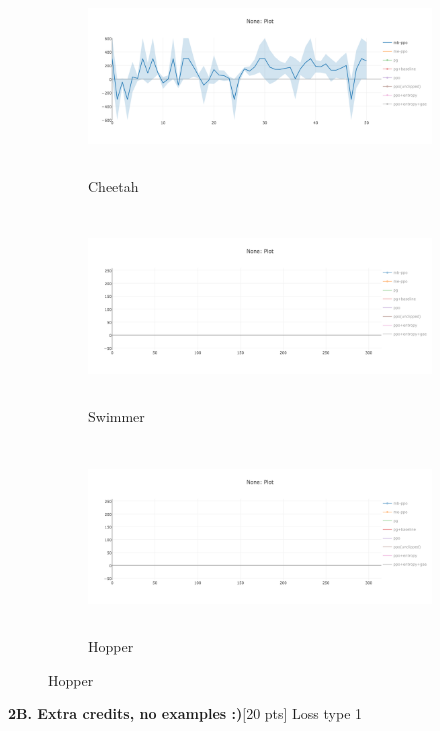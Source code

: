 \documentclass[10pt]{article}
\begin{document}
\begin{figure}[ht!]
    \centering
    \begin{subfigure}[h]{0.6\linewidth}
        \centering
        \includegraphics[height=2in]{figures/mbppo.png}
        \caption{Cheetah}
    \end{subfigure}
    \vskip 0.3in
    \begin{subfigure}[h]{0.6\textwidth}
        \centering
        \includegraphics[height=2in]{figures/newplot.png}
        \caption{Swimmer}
    \end{subfigure}
    \vskip 0.3in
    \begin{subfigure}[h]{0.6\textwidth}
        \centering
        \includegraphics[height=2in]{figures/newplot.png}
        \caption{Hopper}
    \end{subfigure}
\end{figure}
\clearpage
\textbf{2B. Extra credits, no examples :)}[20 pts] Loss type 1
\end{document}
